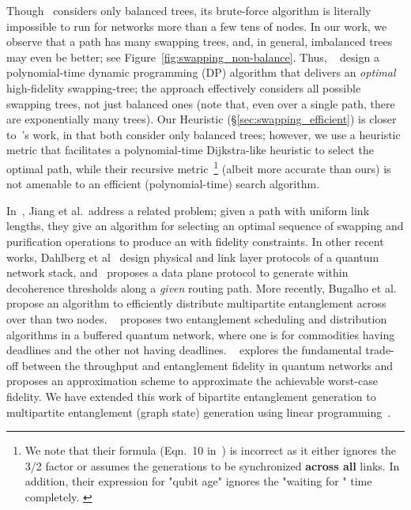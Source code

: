 Though~\cite{caleffi} considers only balanced trees, its 
brute-force algorithm is literally impossible to run for 
networks more than a few tens of nodes.
In our work, we observe that a path has many swapping trees, 
and, in general, imbalanced trees may even
be better; see Figure~\ref{fig:swapping_non-balance}. 
Thus, ~\cite{swapping-tqe-22} design a polynomial-time dynamic programming (DP) algorithm that delivers 
an \textit{optimal} high-fidelity swapping-tree;
the approach effectively considers all possible swapping trees, 
not just balanced ones (note that, even over a single path, 
there are exponentially many trees). 
Our \dpalt Heuristic (\S\ref{sec:swapping_efficient}) is closer to~\cite{caleffi}'s work, 
in that both 
consider only balanced trees; however, we use a heuristic metric that facilitates a polynomial-time Dijkstra-like heuristic to select the optimal path, while their recursive metric~\footnote{We note that their formula (Eqn.~10 in~\cite{caleffi}) is incorrect as it either ignores the 3/2 factor or assumes the \eps generations to be synchronized {\bf across all} links. In addition, their expression for "qubit age" ignores the "waiting for \es" time completely. \label{ft:swapping_wrong}} 
(albeit more accurate than ours) is not amenable to an efficient (polynomial-time) search algorithm. 

In~\cite{Jiang17291}, Jiang et al.\ address a related problem; given a 
path with uniform link lengths, they give an algorithm for selecting an 
optimal sequence of swapping and purification operations 
to produce an \eps with fidelity constraints.  
In other recent works, Dahlberg et al~\cite{sigcomm19} design physical and link layer protocols
of a quantum network stack, and~\cite{conext20} proposes a data plane protocol to generate \epss
within decoherence thresholds along a \emph{given} routing path. 
More recently, Bugalho et al.~\cite{bugalho2021distributing} propose an algorithm to efficiently distribute multipartite entanglement across over than two nodes.
~\cite{huayue_esdi} proposes two entanglement scheduling and distribution algorithms in a buffered quantum network, where one is for commodities having deadlines and the other not having deadlines.
~\cite{huayue_fendi} explores the fundamental trade-off between the throughput and entanglement fidelity in quantum networks 
and proposes an approximation scheme to approximate the achievable worst-case fidelity.
We have extended this work of bipartite entanglement generation to multipartite entanglement (graph state) generation using linear programming~\cite{fan2024optimized}.

